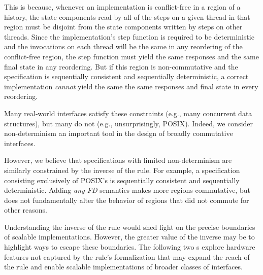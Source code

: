 This is because, whenever an implementation is conflict-free in a
region of a history, the state components read by all of the steps on
a given thread in that region must be disjoint from the state
components written by steps on other threads.  Since the
implementation's step function is required to be deterministic and the
invocations on each thread will be the same in any reordering of the
conflict-free region, the step function must yield the same responses
and the same final state in any reordering.
%
But if this region is non-commutative and the specification is
sequentially consistent and sequentially deterministic, a correct
implementation \emph{cannot} yield the same the same responses and
final state in every reordering.

Many real-world interfaces satisfy these constraints (e.g., many
concurrent data structures), but many do not (e.g., unsurprisingly,
POSIX).  Indeed, we consider non-determinism an important tool in the
design of broadly commutative interfaces.

However, we believe that specifications with limited non-determinism
are similarly constrained by the inverse of the rule.
%
%
For example, a specification consisting exclusively of POSIX's
 is sequentially consistent and sequentially deterministic.
Adding \emph{any FD} semantics makes more regions commutative, but
does not fundamentally alter the behavior of regions that did not
commute for other reasons.

Understanding the inverse of the rule would shed light on the precise
boundaries of scalable implementations.
%
However, the greater value of the inverse may be to highlight ways to
escape these boundaries.  The following two
s explore hardware features not
captured by the rule's formalization that may expand the reach of the
rule and enable scalable implementations of broader classes of
interfaces.




